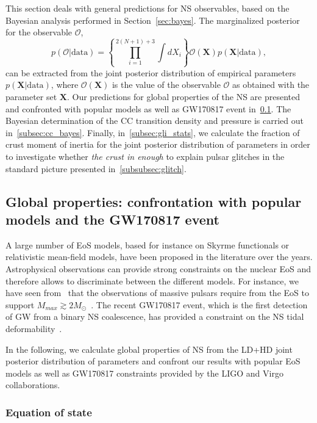 This section deals with general predictions for NS observables, based on the
Bayesian analysis performed in Section~\ref{sec:bayes}. The marginalized
posterior for the observable $\mathcal{O}$,
%
\begin{equation}
  p(\mathcal{O}|\text{data}) = \left\{\prod_{i=1}^{2(N+1)+3}\int
  dX_i\right\}\mathcal{O}(\bm{X})p(\bm{X}|\text{data}),\label{eq:margobs}
\end{equation}
%
can be extracted from the joint posterior distribution of empirical parameters
$p(\bm{X}|\text{data})$, where $\mathcal{O}(\bm{X})$ is the value of the
observable $\mathcal{O}$ as obtained with the parameter set $\bm{X}$.
Our predictions for global properties of the NS are presented and confronted 
with popular models as well as GW170817 event in~\ref{subsec:gw17}. The 
Bayesian determination of the CC transition density and pressure is carried out 
in~\ref{subsec:cc_bayes}.
Finally, in~\ref{subsec:gli_stats}, we calculate the fraction of crust moment
of inertia for the joint posterior distribution of parameters in order to 
investigate whether \textit{the crust in enough} to explain pulsar glitches in 
the standard picture presented in~\ref{subsubsec:glitch}.

\subsection{Global properties: confrontation with popular models and the 
GW170817 event}\label{subsec:gw17}

A large number of EoS models, based for instance on Skyrme functionals or 
relativistic mean-field models, have been proposed in the literature over the 
years. Astrophysical observations can provide strong constraints on the
nuclear EoS  and therefore allows to discriminate between the different models. 
For instance, we have seen from~\label{subsec:masses} that the observations of 
massive pulsars require from the EoS to support $M_{max} \gtrsim
2M_\odot$~\cite{Demorest2010,Antoniadis2013,Cromartie2020}.
The recent GW170817 event, which is the first detection of GW from a 
binary NS coalescence, has provided a constraint on the NS tidal 
deformability~\cite{GWtidal,GW1,GW2}.

In the following, we calculate global properties of NS from the LD+HD joint 
posterior distribution of parameters and confront our results with popular EoS 
models as well as GW170817 constraints provided by the LIGO and Virgo 
collaborations.

\subsubsection{Equation of state} %

